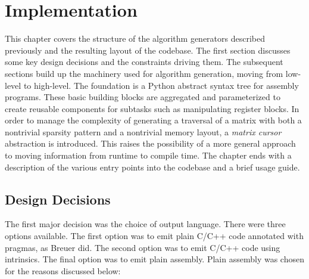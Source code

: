 
\chapter{Implementation}
\label{chapter:implementation}

This chapter covers the structure of the algorithm generators described previously and the resulting layout of the codebase. The first section discusses some key design decisions and the constraints driving them. The subsequent sections build up the machinery used for algorithm generation, moving from low-level to high-level. The foundation is a Python abstract syntax tree for assembly programs. These basic building blocks are aggregated and parameterized to create reusable components for subtasks such as manipulating register blocks. In order to manage the complexity of generating a traversal of a matrix with both a nontrivial sparsity pattern and a nontrivial memory layout, a \emph{matrix cursor} abstraction is introduced. This raises the possibility of a more general approach to moving information from runtime to compile time. The chapter ends with a description of the various entry points into the codebase and a brief usage guide.

\section{Design Decisions}

The first major decision was the choice of output language. There were three options available. The first option was to emit plain C/C++ code annotated with pragmas, as Breuer did. The second option was to emit C/C++ code using intrinsics. The final option was to emit plain assembly. Plain assembly was chosen for the reasons discussed below:

